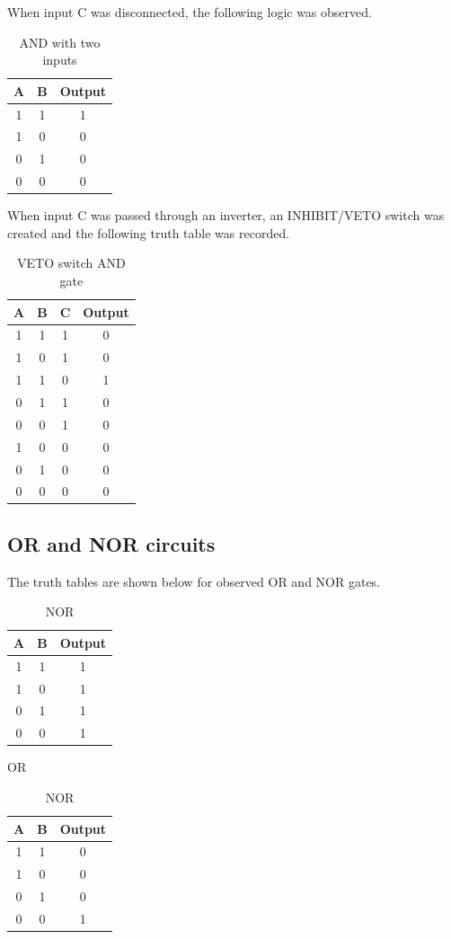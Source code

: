 \documentclass{article}
\begin{document}
\vspace{2cm}
When input C was disconnected, the following logic was observed. 

\begin{table}[h]
    \centering
     \begin{tabular}{c c |c}
    A & B & Output\\
    \hline
    1&1&1\\
    1&0&0\\
    0&1&0\\
    0&0&0\\
    \end{tabular}
    \caption{AND with two inputs}
    \label{tab:6}
\end{table}

When input C was passed through an inverter, an INHIBIT/VETO switch was created and the following truth table was recorded.

\begin{table}[h]
    \centering
    \begin{tabular}{c c c|c}
    A & B & C & Output\\
    \hline
    1&1&1&0\\
    1&0&1&0\\
    1&1&0&1\\
    0&1&1&0\\
    0&0&1&0\\
    1&0&0&0\\
    0&1&0&0\\
    0&0&0&0\\
    \end{tabular}
    \caption{VETO switch AND gate}
    \label{tab:7}
\end{table}


\vspace{2cm}    

\subsection*{OR and NOR circuits}
The truth tables are shown below for observed OR and NOR gates.
\begin{table}[h]
\centering
\parbox{.45\linewidth}{
    \centering
    \begin{tabular}{c c | c}
    A & B & Output\\
    \hline
    1&1&1\\
    1&0&1\\
    0&1&1\\
    0&0&1\\
    \end{tabular}
    \caption{OR}
    \label{tab:3}
}   
\parbox{.45\linewidth}{
    \centering
    \begin{tabular}{c c |c}
    A & B & Output\\
    \hline
    1&1&0\\
    1&0&0\\
    0&1&0\\
    0&0&1\\
    \end{tabular}
    \caption{NOR}
    \label{tab:4}
}   
\end{table}
\end{document}
